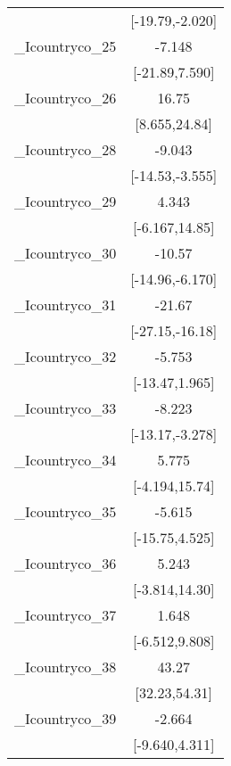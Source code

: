 {\begin{tabular}{l*{1}{c}}
            &       [-19.79,-2.020]         \\
[1em]
\_Icountryco\_25&                -7.148         \\
            &        [-21.89,7.590]         \\
[1em]
\_Icountryco\_26&                 16.75\sym{***}\\
            &         [8.655,24.84]         \\
[1em]
\_Icountryco\_28&                -9.043\sym{**} \\
            &       [-14.53,-3.555]         \\
[1em]
\_Icountryco\_29&                 4.343         \\
            &        [-6.167,14.85]         \\
[1em]
\_Icountryco\_30&                -10.57\sym{***}\\
            &       [-14.96,-6.170]         \\
[1em]
\_Icountryco\_31&                -21.67\sym{***}\\
            &       [-27.15,-16.18]         \\
[1em]
\_Icountryco\_32&                -5.753         \\
            &        [-13.47,1.965]         \\
[1em]
\_Icountryco\_33&                -8.223\sym{**} \\
            &       [-13.17,-3.278]         \\
[1em]
\_Icountryco\_34&                 5.775         \\
            &        [-4.194,15.74]         \\
[1em]
\_Icountryco\_35&                -5.615         \\
            &        [-15.75,4.525]         \\
[1em]
\_Icountryco\_36&                 5.243         \\
            &        [-3.814,14.30]         \\
[1em]
\_Icountryco\_37&                 1.648         \\
            &        [-6.512,9.808]         \\
[1em]
\_Icountryco\_38&                 43.27\sym{***}\\
            &         [32.23,54.31]         \\
[1em]
\_Icountryco\_39&                -2.664         \\
            &        [-9.640,4.311]         \\

\end{tabular}}
